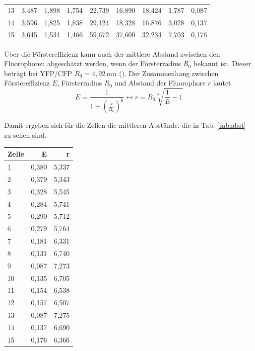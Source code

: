 \begin{center}
\begin{tabular}{lrrrrrrrr}
        13    & 3,487 & 1,898 & 1,754 &  22,739 &  16,890 & 18,424 &  1,787 & 0,087 \\
        14    & 3,596 & 1,825 & 1,838 &  29,124 &  18,328 & 16,876 &  3,028 & 0,137 \\
        15    & 3,645 & 1,534 & 1,466 &  59,672 &  37,600 & 32,234 &  7,703 & 0,176 \\
        \bottomrule
    \end{tabular}
    \label{tab:CY}
\end{center}

Über die Förstereffizienz kann auch der mittlere Abstand zwischen den Fluorophoren abgeschätzt werden, wenn der Försterradius $R_0$ bekannt ist. 
Dieser beträgt bei YFP/CFP $R_0 = 4,92\,nm$ (\cite{Patterson2000}). Der Zusammenhang zwischen Förstereffizienz $E$, Försterradius $R_0$ und Abstand der Fluorophore $r$ 
lautet 
\begin{equation*}
    E = \frac{1}{1+(\frac{r}{R_0})^6} \leftrightarrow r = R_0 \sqrt[6]{\frac{1}{E} -1}
\end{equation*}

Damit ergeben sich für die Zellen die mittleren Abstände, die in Tab. \ref{tab:abst} zu sehen sind.

\begin{center}
    \centering
    \begin{tabular}{lrr}
        \toprule
        Zelle &     E &     r \\
        \midrule
        1     & 0,380 & 5,337 \\
        2     & 0,379 & 5,343 \\
        3     & 0,328 & 5,545 \\
        4     & 0,284 & 5,741 \\
        5     & 0,290 & 5,712 \\
        6     & 0,279 & 5,764 \\
        7     & 0,181 & 6,331 \\
        8     & 0,131 & 6,740 \\
        9     & 0,087 & 7,273 \\
        10    & 0,135 & 6,705 \\
        11    & 0,154 & 6,538 \\
        12    & 0,157 & 6,507 \\
        13    & 0,087 & 7,275 \\
        14    & 0,137 & 6,690 \\
        15    & 0,176 & 6,366 \\
        \bottomrule
    \end{tabular}
    \label{tab:abst}
\end{center}




